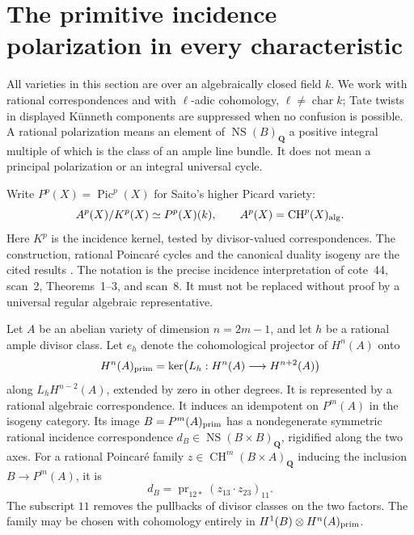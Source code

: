 \section{The primitive incidence polarization in every characteristic}
\label{sec:T4}

All varieties in this section are over an algebraically closed field $k$.
We work with rational correspondences and with $\ell$-adic cohomology,
$\ell\ne\operatorname{char}k$; Tate twists in displayed K\"unneth components
are suppressed when no confusion is possible. A rational polarization means
an element of $\operatorname{NS}(B)_{\mathbf Q}$ a positive integral multiple
of which is the class of an ample line bundle. It does not mean a principal
polarization or an integral universal cycle.

Write $P^p(X)=\operatorname{Pic}^p(X)$ for Saito's higher Picard variety:
\[
 A^p(X)/K^p(X)\simeq P^p(X)(k),\qquad
 A^p(X)=\operatorname{CH}^p(X)_{\rm alg}.
\]
Here $K^p$ is the incidence kernel, tested by divisor-valued
correspondences. The construction, rational Poincar\'e cycles and the
canonical duality isogeny are the cited results
\cite[Theorem~3.6, \S4.1, Proposition~4.4]{Saito1979}.
The notation is the precise incidence interpretation of cote~44,
scan~2, Theorems~1--3, and scan~8. It must not be replaced without proof
by a universal regular algebraic representative.

\begin{lemma}
\label{lem:primitive-summand}
Let $A$ be an abelian variety of dimension $n=2m-1$, and let $h$ be a
rational ample divisor class. Let $e_h$ denote the cohomological projector
of $H^n(A)$ onto
\[
 H^n(A)_{\rm prim}=\ker\bigl(L_h:H^n(A)\longrightarrow H^{n+2}(A)\bigr)
\]
along $L_hH^{n-2}(A)$, extended by zero in other degrees.
It is represented by a rational algebraic correspondence. It induces an
idempotent on $P^m(A)$ in the isogeny category. Its image $B=P^m(A)_{\rm prim}$
has a nondegenerate symmetric rational incidence correspondence
$d_B\in\operatorname{NS}(B\times B)_{\mathbf Q}$, rigidified along the two
axes. For a rational Poincar\'e family $z\in\operatorname{CH}^m(B\times A)_{\mathbf Q}$
inducing the inclusion $B\longrightarrow P^m(A)$, it is
\begin{equation}\label{eq:incidence}
 d_B=\operatorname{pr}_{12*}(z_{13}\cdot z_{23})_{11}.
\end{equation}
The subscript $11$ removes the pullbacks of divisor classes on the two
factors. The family may be chosen with cohomology entirely in
$H^1(B)\otimes H^n(A)_{\rm prim}$.
\end{lemma}

